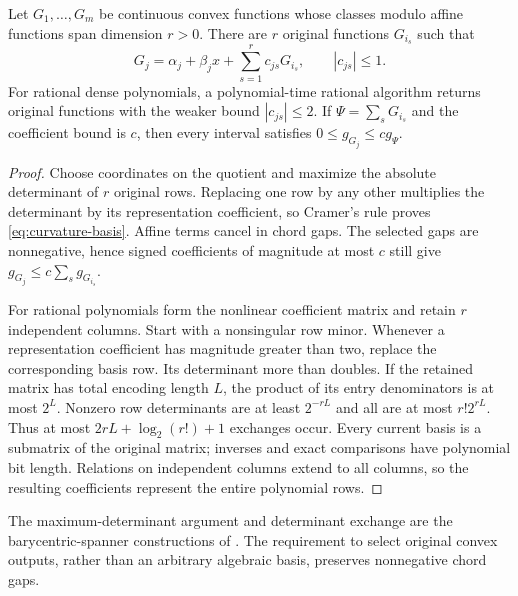 \begin{lemma}\label{lem:curvature-spanner}
Let $G_1,\ldots,G_m$ be continuous convex functions whose classes modulo
affine functions span dimension $r>0$. There are $r$ original functions
$G_{i_s}$ such that
\begin{equation}\label{eq:curvature-basis}
 G_j=\alpha_j+\beta_jx+\sum_{s=1}^r c_{js}G_{i_s},
 \qquad |c_{js}|\le1.
\end{equation}
For rational dense polynomials, a polynomial-time rational algorithm
returns original functions with the weaker bound $|c_{js}|\le2$.
If $\Psi=\sum_sG_{i_s}$ and the coefficient bound is $c$, then every
interval satisfies $0\le g_{G_j}\le c g_\Psi$.
\end{lemma}
\begin{proof}
Choose coordinates on the quotient and maximize the absolute determinant
of $r$ original rows. Replacing one row by any other multiplies the
determinant by its representation coefficient, so Cramer's rule proves
\eqref{eq:curvature-basis}. Affine terms cancel in chord gaps. The selected
gaps are nonnegative, hence signed coefficients of magnitude at most $c$
still give $g_{G_j}\le c\sum_sg_{G_{i_s}}$.

For rational polynomials form the nonlinear coefficient matrix and
retain $r$ independent columns. Start with a nonsingular row minor.
Whenever a representation coefficient has magnitude greater than two,
replace the corresponding basis row. Its determinant more than doubles.
If the retained matrix has total encoding length $L$, the product of
its entry denominators is at most $2^L$. Nonzero row determinants are
at least $2^{-rL}$ and all are at most $r!2^{rL}$. Thus at most
$2rL+\log_2(r!)+1$ exchanges occur. Every current basis is a submatrix
of the original matrix; inverses and exact comparisons have polynomial
bit length. Relations on independent columns extend to all columns,
so the resulting coefficients represent the entire polynomial rows.
\end{proof}

The maximum-determinant argument and determinant exchange are the
barycentric-spanner constructions of \citet[Section 2.3,
Propositions 2.2 and 2.4]{awerbuch2004}. The requirement to select original
convex outputs, rather than an arbitrary algebraic basis, preserves
nonnegative chord gaps.

